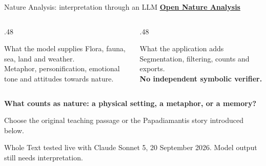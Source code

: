 \documentclass[aspectratio=169,10pt]{beamer}
\newcommand{\key}[1]{\textcolor{aegean}{\textbf{#1}}}
\newcommand{\hl}[1]{\textcolor{terracotta}{\textbf{#1}}}
\newcommand{\source}[1]{\vfill{\scriptsize\color{slate}#1\par}}
\newcommand{\question}[1]{\medskip\par\key{#1}\par}
\begin{document}
\begin{frame}{Nature Analysis: interpretation through an LLM}
  \href{https://greek-app-heaven-nature.livelyhill-85880e66.westeurope.azurecontainerapps.io}{\textbf{Open Nature Analysis}}\par\medskip
  \begin{columns}[T]
    \begin{column}{.48\textwidth}
      \begin{block}{What the model supplies}
        Flora, fauna, sea, land and weather.\\[5pt]
        Metaphor, personification, emotional tone and attitudes towards nature.
      \end{block}
    \end{column}
    \begin{column}{.48\textwidth}
      \begin{block}{What the application adds}
        Segmentation, filtering, counts and exports.\\[5pt]
        \hl{No independent symbolic verifier.}
      \end{block}
    \end{column}
  \end{columns}
  \question{What counts as nature: a physical setting, a metaphor, or a memory?}
  \small Choose the original teaching passage or the Papadiamantis story introduced below.
  \source{Whole Text tested live with Claude Sonnet 5, 20 September 2026. Model output still needs interpretation.}
\end{frame}
\end{document}
